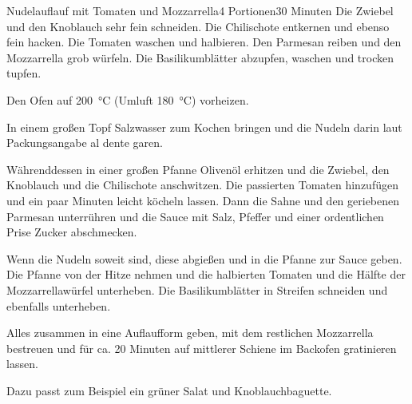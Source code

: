 \documentclass[a4paper]{article}
\begin{document}
\begin{recipe}{Nudelauflauf mit Tomaten und Mozzarrella}{4 Portionen}{30 Minuten}
Die Zwiebel und den Knoblauch sehr fein schneiden. Die Chilischote entkernen
und ebenso fein hacken. Die Tomaten waschen und halbieren. Den Parmesan
reiben und den Mozzarrella grob würfeln. Die Basilikumblätter abzupfen, waschen
und trocken tupfen.

Den Ofen auf \SI{200}{\celsius} (Umluft \SI{180}{\celsius}) vorheizen.

In einem großen Topf Salzwasser zum Kochen bringen und die Nudeln darin laut
Packungsangabe al dente garen.

Währenddessen in einer großen Pfanne Olivenöl erhitzen und die Zwiebel, den
Knoblauch und die Chilischote anschwitzen. Die passierten Tomaten hinzufügen
und ein paar Minuten leicht köcheln lassen. Dann die Sahne und den geriebenen
Parmesan unterrühren und die Sauce mit Salz, Pfeffer und einer ordentlichen
Prise Zucker abschmecken.

Wenn die Nudeln soweit sind, diese abgießen und in die Pfanne zur Sauce geben.
Die Pfanne von der Hitze nehmen und die halbierten Tomaten und die Hälfte
der Mozzarrellawürfel unterheben. Die Basilikumblätter in Streifen schneiden
und ebenfalls unterheben.

Alles zusammen in eine Auflaufform geben, mit dem restlichen Mozzarrella
bestreuen und für ca. 20 Minuten auf mittlerer Schiene im Backofen gratinieren
lassen.

Dazu passt zum Beispiel ein grüner Salat und Knoblauchbaguette.
\end{recipe}
\end{document}
